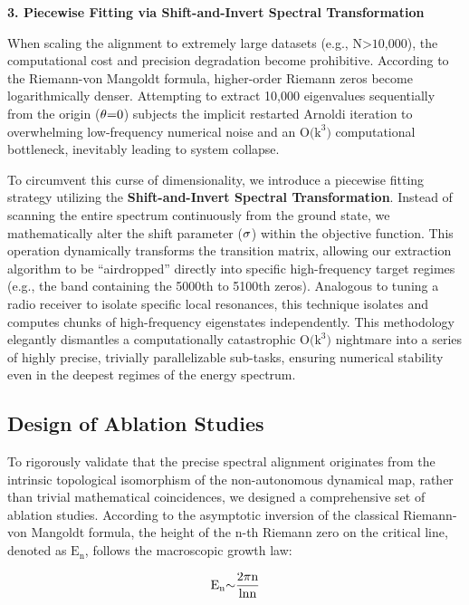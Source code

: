 \documentclass[fleqn,10pt]{wlscirep}
\begin{document}
\textbf{3. Piecewise Fitting via Shift-and-Invert Spectral
Transformation}

When scaling the alignment to extremely large datasets (e.g.,
\(\text{N}\text{>10,000}\)), the computational cost and precision
degradation become prohibitive. According to the Riemann-von Mangoldt
formula, higher-order Riemann zeros become logarithmically denser.
Attempting to extract 10,000 eigenvalues sequentially from the origin
(\(\text{\ensuremath{\theta}}\text{=0}\)) subjects the implicit restarted Arnoldi
iteration to overwhelming low-frequency numerical noise and an
\(\text{O}\text{(}\text{k}^{\text{3}}\text{)}\) computational
bottleneck, inevitably leading to system collapse.

To circumvent this curse of dimensionality, we introduce a piecewise
fitting strategy utilizing the \textbf{Shift-and-Invert Spectral
Transformation}. Instead of scanning the entire spectrum continuously
from the ground state, we mathematically alter the shift parameter
(\(\text{\ensuremath{\sigma}}\)) within the objective function. This operation dynamically
transforms the transition matrix, allowing our extraction algorithm to
be ``airdropped'' directly into specific high-frequency target regimes
(e.g., the band containing the 5000th to 5100th zeros). Analogous to
tuning a radio receiver to isolate specific local resonances, this
technique isolates and computes chunks of high-frequency eigenstates
independently. This methodology elegantly dismantles a computationally
catastrophic \(\text{O}\text{(}\text{k}^{\text{3}}\text{)}\) nightmare
into a series of highly precise, trivially parallelizable sub-tasks,
ensuring numerical stability even in the deepest regimes of the energy
spectrum.

\subsection*{Design of Ablation Studies}

To rigorously validate that the precise spectral alignment originates
from the intrinsic topological isomorphism of the non-autonomous
dynamical map, rather than trivial mathematical coincidences, we
designed a comprehensive set of ablation studies. According to the
asymptotic inversion of the classical Riemann-von Mangoldt formula, the
height of the \(\text{n}\)-th Riemann zero on the critical line, denoted
as \(\text{E}_{\text{n}}\), follows the macroscopic growth law:

\[\text{E}_{\text{n}}\text{\ensuremath{\sim}}\frac{\text{2}\text{\ensuremath{\pi}n}}{\text{ln}\text{n}}\]
\end{document}
